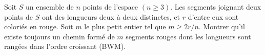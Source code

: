 Soit $S$ un ensemble de $n$ points de l'espace $(n \geq 3)$. Les segments joignant deux points de $S$ ont des longueurs deux à deux distinctes, et $r$ d'entre eux sont coloriés en rouge. Soit $m$ le plus petit entier tel que $m \geq 2r/n$. Montrer qu'il existe toujours un chemin formé de $m$ segments rouges dont les longueurs sont rangées dans l'ordre croissant (BWM).

